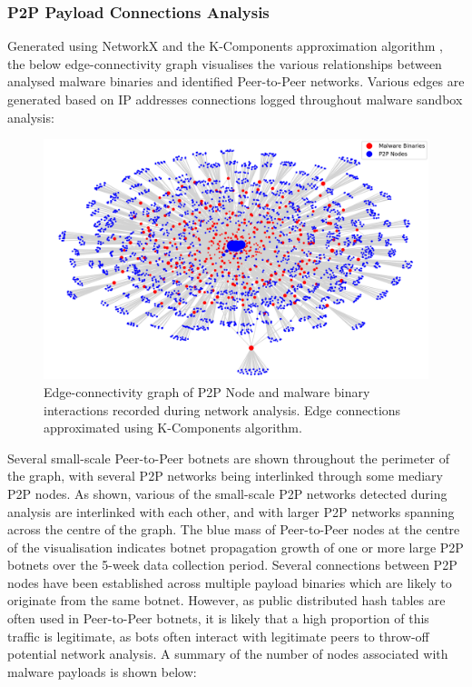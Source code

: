 \subsubsection{P2P Payload Connections Analysis} Generated using NetworkX \citep{NetworkX} and the K-Components approximation algorithm \cite{NetworkXKComponents}, the below edge-connectivity graph visualises the various relationships between analysed malware binaries and identified Peer-to-Peer networks. Various edges are generated based on IP addresses connections logged throughout malware sandbox analysis:

\begin{figure}[!htb]
    \centering
    \includegraphics[width=0.95\linewidth]{results/p2p_payload_network.png}
    \caption{Edge-connectivity graph of P2P Node and malware binary interactions recorded during network analysis. Edge connections approximated using K-Components algorithm.}
    \label{fig:p2p_payload_networks} 
\end{figure}

Several small-scale Peer-to-Peer botnets are shown throughout the perimeter of the graph, with several P2P networks being interlinked through some mediary P2P nodes. As shown, various of the small-scale P2P networks detected during analysis are interlinked with each other, and with larger P2P networks spanning across the centre of the graph. The blue mass of Peer-to-Peer nodes at the centre of the visualisation indicates botnet propagation growth of one or more large P2P botnets over the 5-week data collection period. Several connections between P2P nodes have been established across multiple payload binaries which are likely to originate from the same botnet. However, as public distributed hash tables are often used in Peer-to-Peer botnets, it is likely that a high proportion of this traffic is legitimate, as bots often interact with legitimate peers to throw-off potential network analysis. \citep{Herwig2019} A summary of the number of nodes associated with malware payloads is shown below:

